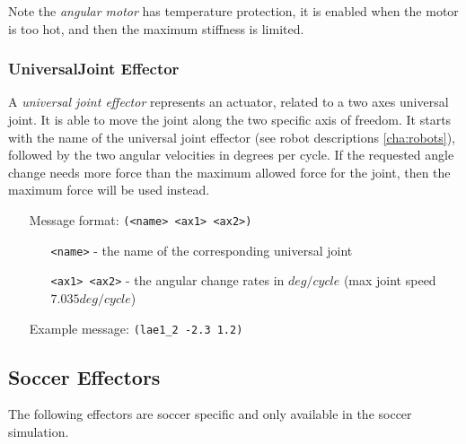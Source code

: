 Note the \emph{angular motor} has temperature protection, it is
enabled when the motor is too hot, and then the maximum stiffness is
limited.

\subsubsection{UniversalJoint Effector}
\label{sec:UJE}
A \emph{universal joint effector} represents an actuator, related to a two axes
universal joint. It is able to move the joint along the two specific axis of
freedom. It starts with the name of the universal joint effector (see robot
descriptions \ref{cha:robots}), followed by the two angular velocities in
degrees per cycle. If the requested angle change needs more force than the
maximum allowed force for the joint, then the maximum force will be used
instead.

\begin{itemize}
	\item[Message format:] \texttt{(<name> <ax1> <ax2>)}
		\begin{itemize}
		  \item[\texttt{<name>} -] the name of the corresponding universal joint
		  \item[\texttt{<ax1> <ax2>} -] the angular change rates in $deg/cycle$ (max joint
		  speed $7.035 deg/cycle$) 
		\end{itemize}
	\item[Example message:] \texttt{(lae1\_2 -2.3 1.2)}
\end{itemize}





\subsection{Soccer Effectors}
\label{sec:soccereffectors}
The following effectors are soccer specific and only available in the soccer
simulation.



